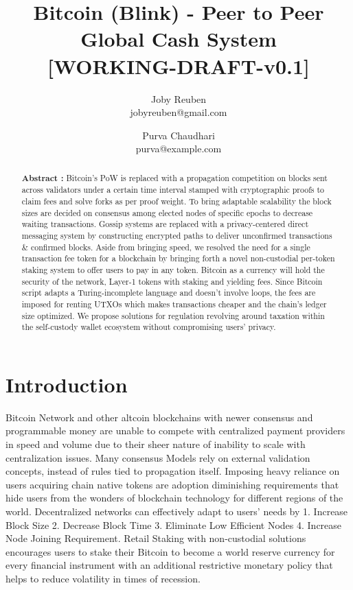 \documentclass[a4paper,10pt]{article}
\title{
 \large \textbf{Bitcoin (Blink) - Peer to Peer Global Cash System}\\
\vspace{6mm}
\scriptsize [WORKING-DRAFT-v0.1]
}
\author{ \myfontt Joby Reuben \\ \myfontt jobyreuben@gmail.com \and  \myfontt Purva Chaudhari \\ \myfontt purva@example.com}
\date{}
\begin{document}
\maketitle
\begin{abstract}
\noindent \textbf{Abstract :} Bitcoin's PoW is replaced with a propagation competition on blocks sent across validators under a certain time interval stamped with cryptographic proofs to claim fees and solve forks as per proof weight. To bring adaptable scalability the block sizes are decided on consensus among elected nodes of specific epochs to decrease waiting transactions. Gossip systems are replaced with a privacy-centered direct messaging system by constructing encrypted paths to deliver unconfirmed transactions \& confirmed blocks. Aside from bringing speed, we resolved the need for a single transaction fee token for a blockchain by bringing forth a novel non-custodial per-token staking system to offer users to pay in any token. Bitcoin as a currency will hold the security of the network, Layer-1 tokens with staking and yielding fees. Since Bitcoin script adapts a Turing-incomplete language and doesn't involve loops, the fees are imposed for renting UTXOs which makes transactions cheaper and the chain's ledger size optimized. We propose solutions for regulation revolving around taxation within the self-custody wallet ecosystem without compromising users' privacy. 
\end{abstract}
\section{Introduction}
Bitcoin Network and other altcoin blockchains with newer consensus and programmable money are unable to compete with centralized payment providers in speed and volume due to their sheer nature of inability to scale with centralization issues. Many consensus Models rely on external validation concepts, instead of rules tied to propagation itself. Imposing heavy reliance on users acquiring chain native tokens are adoption diminishing requirements that hide users from the wonders of blockchain technology for different regions of the world. Decentralized networks can effectively adapt to users' needs by 1. Increase Block Size 2. Decrease Block Time 3. Eliminate Low Efficient Nodes 4. Increase Node Joining Requirement. Retail Staking with non-custodial solutions encourages users to stake their Bitcoin to become a world reserve currency for every financial instrument with an additional restrictive monetary policy that helps to reduce volatility in times of recession.
\end{document}
